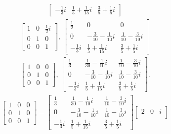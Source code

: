 \documentclass[12pt]{article}
\begin{document}
\begin{enumerate}
\begin{align*}
\begin{bmatrix}
        -\frac{1}{3}i & \frac{1}{5}+\frac{1}{15}i & \frac{3}{5}+\frac{1}{5}i
      \end{bmatrix}
    \end{align*}
    \begin{align*}
      \begin{bmatrix}
        1 & 0 & \frac{1}{2}i\\
        0 & 1 & 0\\
        0 & 0 & 1
      \end{bmatrix},\
      \begin{bmatrix}
        \frac{1}{2} & 0 & 0\\
        0 & -\frac{3}{10}-\frac{1}{10}i & \frac{1}{10}-\frac{3}{10}i\\
        -\frac{1}{3}i & \frac{1}{5}+\frac{1}{15}i & \frac{3}{5}+\frac{1}{5}i
      \end{bmatrix}
    \end{align*}
    \begin{align*}
      \begin{bmatrix}
        1 & 0 & 0\\
        0 & 1 & 0\\
        0 & 0 & 1
      \end{bmatrix},\
      \begin{bmatrix}
        \frac{1}{3} & \frac{1}{30}-\frac{1}{10}i & \frac{1}{10}-\frac{3}{10}i\\
        0 & -\frac{3}{10}-\frac{1}{10}i & \frac{1}{10}-\frac{3}{10}i\\
        -\frac{1}{3}i & \frac{1}{5}+\frac{1}{15}i & \frac{3}{5}+\frac{1}{5}i
      \end{bmatrix}.
    \end{align*}
    \begin{align*}
      \begin{bmatrix}
        1 & 0 & 0\\
        0 & 1 & 0\\
        0 & 0 & 1
      \end{bmatrix}=
      \begin{bmatrix}
        \frac{1}{3} & \frac{1}{30}-\frac{1}{10}i & \frac{1}{10}-\frac{3}{10}i\\
        0 & -\frac{3}{10}-\frac{1}{10}i & \frac{1}{10}-\frac{3}{10}i\\
        -\frac{1}{3}i & \frac{1}{5}+\frac{1}{15}i & \frac{3}{5}+\frac{1}{5}i
      \end{bmatrix}
      \begin{bmatrix}
        2 & 0 & i\\

\end{bmatrix}
\end{align*}
\end{enumerate}
\end{document}
